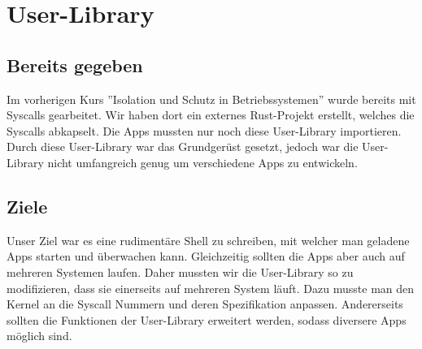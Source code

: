\section{User-Library}

\subsection{Bereits gegeben}
    Im vorherigen Kurs ''Isolation und Schutz in Betriebssystemen'' wurde bereits mit Syscalls gearbeitet. Wir haben dort ein externes Rust-Projekt erstellt, welches die Syscalls abkapselt. Die Apps mussten nur noch diese User-Library importieren. \newline
    Durch diese User-Library war das Grundgerüst gesetzt, jedoch war die User-Library nicht umfangreich genug um verschiedene Apps zu entwickeln.
    

\subsection{Ziele}
    Unser Ziel war es eine rudimentäre Shell zu schreiben, mit welcher man geladene Apps starten und überwachen kann. Gleichzeitig sollten die Apps aber auch auf mehreren Systemen laufen. Daher mussten wir die User-Library so zu modifizieren, dass sie einerseits auf mehreren System läuft. Dazu musste man den Kernel an die Syscall Nummern und deren Spezifikation anpassen. Andererseits sollten die Funktionen der User-Library erweitert werden, sodass diversere Apps möglich sind.


